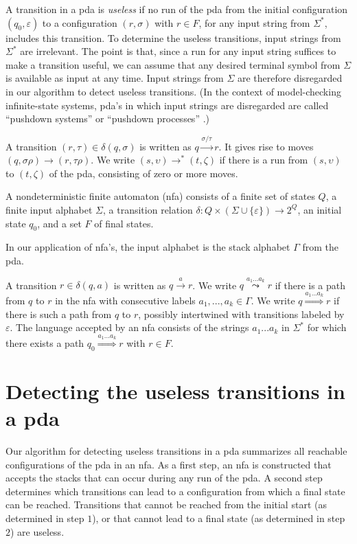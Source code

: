 \documentclass{llncs}
\newcommand{\eps}{\ensuremath{\varepsilon}}
\begin{document}
A transition in a pda is \emph{useless} if no run of the pda from the initial configuration
$(q_0,\eps)$ to a configuration $(r,\sigma)$ with $r\in F$, for any input string from $\Sigma^*$,
includes this transition. To determine the useless transitions, input strings from $\Sigma^*$ are irrelevant.
The point is that, since a run for any input string suffices to make a transition useful,
we can assume that any desired terminal symbol from $\Sigma$ is available as input at any time.
Input strings from $\Sigma$ are therefore disregarded in our algorithm to detect useless transitions.
(In the context of model-checking infinite-state systems, pda's in which input strings are disregarded
are called ``pushdown systems'' or ``pushdown processes'' \cite{Walukiewicz96}.)

A transition $(r,\tau)\in\delta(q,\sigma)$ is written as $q\stackrel{\sigma/\tau}{\rightarrow}r$.
It gives rise to moves $(q,\sigma\rho)\rightarrow(r,\tau\rho)$.
We write $(s,\upsilon)\rightarrow^*(t,\zeta)$ if there is a run from $(s,\upsilon)$ to $(t,\zeta)$ of the pda,
consisting of zero or more moves.

\begin{definition}\label{def:NFA}
A nondeterministic finite automaton (nfa) consists of
a finite set of states $Q$, a finite input alphabet $\Sigma$,
a transition relation $\delta:Q \times (\Sigma\cup\{\eps\}) \rightarrow 2^Q$, an initial state $q_0$,
and a set $F$ of final states.
\end{definition}

\noindent
In our application of nfa's, the input alphabet is the stack alphabet $\Gamma$ from the pda.

A transition $r\in\delta(q,a)$ is written as $q\stackrel{a}{\rightarrow}r$.
We write $q\stackrel{a_1...a_k}{\leadsto}r$ if there is a path from $q$ to $r$ in the nfa
with consecutive labels $a_1,...,a_k\in\Gamma$.
We write $q\stackrel{a_1...a_k}{\Longrightarrow}r$ if there is such a path from $q$ to $r$,
possibly intertwined with transitions labeled by $\eps$.
The language accepted by an nfa consists of the strings $a_1...a_k$ in $\Sigma^*$ for which there
exists a path $q_0\stackrel{a_1...a_k}{\Longrightarrow}r$ with $r\in F$.


\section{Detecting the useless transitions in a pda}

Our algorithm for detecting useless transitions in a pda summarizes all
reachable configurations of the pda in an nfa. As a first step, an nfa is constructed
that accepts the stacks that can occur during any run of the pda.
A second step determines which transitions can lead to a configuration
from which a final state can be reached. Transitions that cannot be reached from the
initial start (as determined in step $1$), or that cannot lead to a final state (as determined in step $2$)
are useless.
\end{document}
